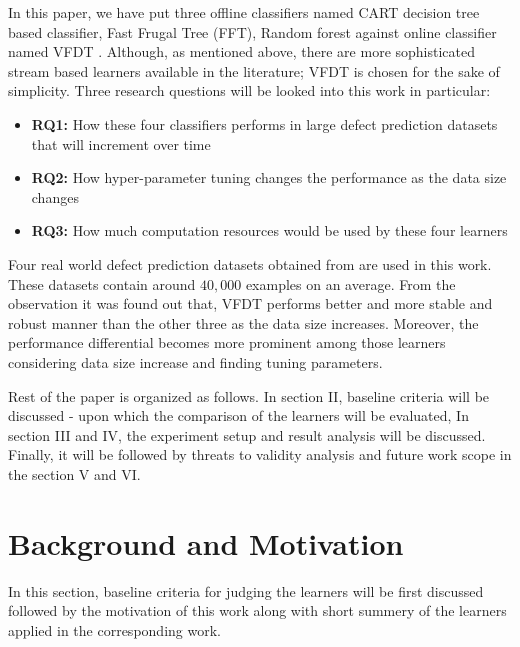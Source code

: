 \documentclass[sigplan]{acmart}\settopmatter{printfolios=true,printccs=false,printacmref=false}
\begin{document}
In this paper, we have put three offline classifiers named CART decision tree based classifier, Fast Frugal Tree (FFT), Random forest against online classifier named VFDT \cite{domingos2000mining}. Although, as mentioned above, there are more sophisticated stream based learners available in the literature; VFDT is chosen for the sake of simplicity. Three research questions will be looked into this work in particular:
\begin{itemize}
	\item \textbf{RQ1: } How these four classifiers performs in large defect prediction datasets that will increment over time
	\item \textbf{RQ2: } How hyper-parameter tuning changes the performance as the data size changes
	\item \textbf{RQ3: } How much computation resources would be used by these four learners 
\end{itemize}

Four real world defect prediction datasets obtained from \cite{github} are used in this work. These datasets contain around $40,000$ examples on an average. From the observation it was found out that, VFDT performs better and more stable and robust manner than the other three as the data size increases. Moreover, the performance differential becomes more prominent among those learners considering data size increase and finding tuning parameters.  

Rest of the paper is organized as follows. In section II, baseline criteria will be discussed - upon which the comparison of the learners will be evaluated, In section III and IV, the experiment setup and result analysis will be discussed. Finally, it will be followed by threats to validity analysis and future work scope in the section V and VI. 

\section{Background and Motivation}
In this section, baseline criteria for judging the learners will be first discussed followed by the motivation of this work along with short summery of the learners applied in the corresponding work.
\end{document}
